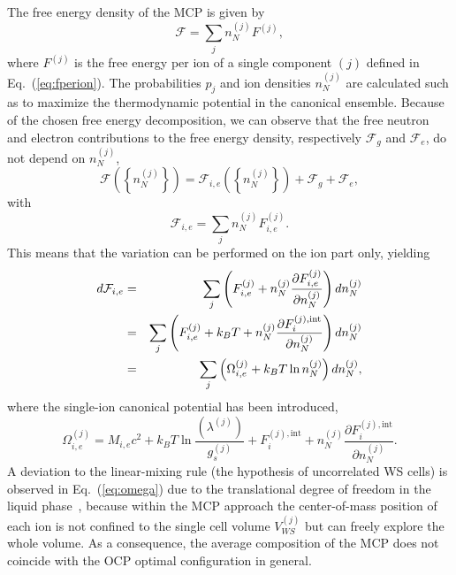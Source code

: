 The free energy density of the MCP is given by
%
\begin{equation}
  \mathcal{F} = \sum_j n_N^{(j)} F^{(j)},
\end{equation}
%
where $F^{(j)}$ is the free energy per ion of a single component $(j)$ defined 
in Eq.~(\ref{eq:fperion}).
The probabilities $p_j$ and ion densities $n_N^{(j)}$ are calculated such as to
maximize the thermodynamic potential in the canonical ensemble. 
Because of the chosen free energy decomposition, we can observe that the 
free neutron and electron contributions to the free energy density, 
respectively $\mathcal{F}_g$ and $\mathcal{F}_e$, do not depend on $n_N^{(j)}$,
%
\begin{equation}
  \mathcal{F}\left(\left\{n_N^{(j)}\right\}\right) 
  = \mathcal{F}_{i,e}\left(\left\{n_N^{(j)}\right\}\right) 
  + \mathcal{F}_g + \mathcal{F}_e,
\end{equation}
%
with
%
\begin{equation}
  \mathcal{F}_{i,e} = \sum_j n_N^{(j)} F_{i,e}^{(j)}.
\end{equation}
%
This means that the variation can be performed on the ion part only, yielding
%
\begin{eqnarray}
  d\mathcal{F}_{i,e} &=& \sum_j \left(F_{i,e}^{(j)} + n_N^{(j)} \frac{\partial
  F_{i,e}^{(j)}}{\partial n_N^{(j)}}\right)dn_N^{(j)} \notag\\
                     &=& \sum_j \left(F_{i,e}^{(j)} + k_B T + n_N^{(j)}
                     \frac{\partial F_i^{(j),\text{int}}}{\partial
                   n_N^{(j)}}\right)dn_N^{(j)} \notag\\
  &=& \sum_j \left(\Omega_{i,e}^{(j)} + k_B T \ln
  n_N^{(j)}\right)dn_N^{(j)},\label{eq:dfi}
\end{eqnarray}
%
where the single-ion canonical potential has been introduced,
%
\begin{equation}
  \Omega_{i,e}^{(j)} = M_{i,e}c^2 + k_B T\ln\frac{(\lambda^{(j)})}{g_s^{(j)}} 
  + F_i^{(j),\text{int}} 
  + n_N^{(j)} \frac{\partial F_i^{(j),\text{int}}}{\partial n_N^{(j)}}.
  \label{eq:omega}
\end{equation}
%
A deviation to the linear-mixing rule (the hypothesis of uncorrelated WS 
cells) is observed in Eq.~(\ref{eq:omega}) due to the translational degree of 
freedom in the liquid phase~\cite{Gulminelli2015}, because within the MCP 
approach the center-of-mass position of each ion is not confined to the single 
cell volume $V_{WS}^{(j)}$ but can freely explore the whole volume. As a 
consequence, the average composition of the MCP does not coincide with the OCP 
optimal configuration in general.


